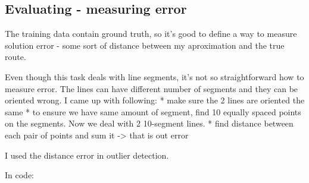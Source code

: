\documentclass[11pt]{article}
\begin{document}
    \subsection{Evaluating - measuring
error}\label{evaluating---measuring-error}

The training data contain ground truth, so it's good to define a way to
measure solution error - some sort of distance between my aproximation
and the true route.

Even though this task deals with line segments, it's not so
straightforward how to measure error. The lines can have different
number of segments and they can be oriented wrong. I came up with
following: * make sure the 2 lines are oriented the same * to ensure we
have same amount of segment, find 10 equally spaced points on the
segments. Now we deal with 2 10-segment lines. * find distance between
each pair of points and sum it -\textgreater{} that is out error

I used the distance error in outlier detection.

In code:
\end{document}
